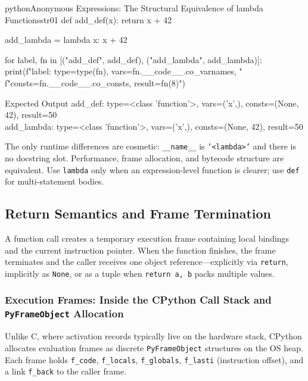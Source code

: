 \documentclass[a4paper,twoside]{report}
\begin{document}
\begin{codebox}[]{python}{Anonymous Expressions: The Structural Equivalence of lambda Functions}{str01}
def add_def(x):
    return x + 42

add_lambda = lambda x: x + 42

for label, fn in [("add_def", add_def), ("add_lambda", add_lambda)]:
    print(f"{label}: type={type(fn)}, vars={fn.__code__.co_varnames}, "
          f"consts={fn.__code__.co_consts}, result={fn(8)}")
\end{codebox}


\begin{iobox}{Expected Output}
add\_def: type=<class 'function'>, vars=('x',), consts=(None, 42), result=50 \\
add\_lambda: type=<class 'function'>, vars=('x',), consts=(None, 42), result=50 \\
\end{iobox}




The only runtime differences are cosmetic: \texttt{\_\_name\_\_} is \texttt{'<lambda>'} and there is no docstring slot. Performance, frame allocation, and bytecode structure are equivalent. Use \texttt{lambda} only when an expression-level function is clearer; use \texttt{def} for multi-statement bodies.


\subsection{Return Semantics and Frame Termination}

A function call creates a temporary execution frame containing local bindings and the current instruction pointer. When the function finishes, the frame terminates and the caller receives one object reference---explicitly via \texttt{return}, implicitly as \texttt{None}, or as a tuple when \texttt{return a, b} packs multiple values.

\subsubsection{Execution Frames: Inside the CPython Call Stack and \texttt{PyFrameObject} Allocation}

Unlike C, where activation records typically live on the hardware stack, CPython allocates evaluation frames as discrete \texttt{PyFrameObject} structures on the OS heap. Each frame holds \texttt{f\_code}, \texttt{f\_locals}, \texttt{f\_globals}, \texttt{f\_lasti} (instruction offset), and a link \texttt{f\_back} to the caller frame.
\end{document}
